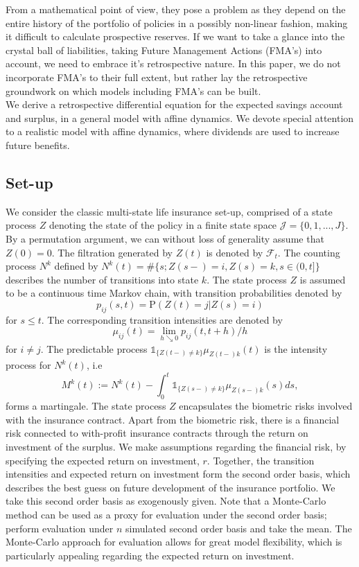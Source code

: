 \documentclass[12pt]{article}
\newcommand{\indic}[1]{\mathds{1}_{ \{ #1 \} }}
\renewcommand{\P}{\text{P}}
\theoremstyle{my_thm}
\begin{document}
From a mathematical point of view, they pose a problem as they depend on the entire history of the portfolio of policies in a possibly non-linear fashion, making it difficult to calculate prospective reserves. If we want to take a glance into the crystal ball of liabilities, taking Future Management Actions (FMA's) into account, we need to embrace it's retrospective nature. In this paper, we do not incorporate FMA's to their full extent, but rather lay the retrospective groundwork on which models including FMA's can be built.
\\[12pt]
We derive a retrospective differential equation for the expected savings account and surplus, in a general model with affine dynamics. We devote special attention to a realistic model with affine dynamics, where dividends are used to increase future benefits. 




\subsection{Set-up}
We consider the classic multi-state life insurance set-up, comprised of a state process $Z$ denoting the state of the policy in a finite state space $\mathcal{J}=\{0,1,...,J\}$. By a permutation argument, we can without loss of generality assume that $Z(0)=0$. The filtration generated by $Z(t)$ is denoted by $\mathcal{F}_t$. The counting process $N^{k}$ defined by $N^{k}(t)=\# \{ s; Z(s-)= i, Z(s)=k, s \in (0,t] \}$ describes the number of transitions into state $k$.  The state process $Z$ is assumed to be a continuous time Markov chain, with transition probabilities denoted by
$$
p_{ij}(s,t)= \P(Z(t)=j|Z(s)=i)
$$
for $s\leq t$. The corresponding transition intensities are denoted by
$$
\mu_{ij}(t)=\lim_{h \searrow 0} p_{ij}(t,t+h)/h
$$
for $i \neq j$. The predictable process $ \indic{Z(t-)\neq k }\mu_{Z(t-)k}(t)$ is the intensity process for $N^{k}(t)$, i.e
$$
M^{k}(t):=N^k(t)-\int_0^t \indic{Z(s-)\neq k } \mu_{Z(s-)k}(s) ds,
$$
forms a martingale. The state process $Z$ encapsulates the biometric risks involved with the insurance contract. Apart from the biometric risk, there is a financial risk connected to with-profit insurance contracts through the return on investment of the surplus. We make assumptions regarding the financial risk, by specifying the expected return on investment, $r$. Together, the transition intensities and expected return on investment form the second order basis, which describes the best guess on future development of the insurance portfolio. We take this second order basis as exogenously given. Note that a Monte-Carlo method can be used as a proxy for evaluation under the second order basis; perform evaluation under $n$ simulated second order basis and take the mean. The Monte-Carlo approach for evaluation allows for great model flexibility, which is particularly appealing regarding the expected return on investment. 
\end{document}
